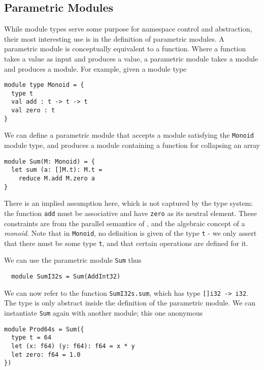 \documentclass[oneside,11pt]{book}
\begin{document}
\subsection{Parametric Modules}

While module types serve some purpose for namespace control and
abstraction, their most interesting use is in the definition of
parametric modules.  A parametric module is conceptually
equivalent to a function.  Where a function takes a value as input and
produces a value, a parametric module takes a module and produces a
module.  For example, given a module type

\begin{lstlisting}
module type Monoid = {
  type t
  val add : t -> t -> t
  val zero : t
}
\end{lstlisting}

We can define a parametric module that accepts a module satisfying
the \texttt{Monoid} module type, and produces a module containing a
function for collapsing an array

\begin{lstlisting}
module Sum(M: Monoid) = {
  let sum (a: []M.t): M.t =
    reduce M.add M.zero a
}
\end{lstlisting}

There is an implied assumption here, which is not captured by the type
system: the function \texttt{add} must be associative and have
\texttt{zero} as its neutral element.  These constraints are from the
parallel semantics of , and the algebraic concept of a
\textit{monoid}.  Note that in \texttt{Monoid}, no definition is given
of the type \texttt{t} - we only assert that there must be some type
\texttt{t}, and that certain operations are defined for it.

We can use the parametric module \texttt{Sum} thus

\begin{lstlisting}
  module SumI32s = Sum(AddInt32)
\end{lstlisting}

We can now refer to the function \texttt{SumI32s.sum}, which has type
\texttt{[]i32 -> i32}.  The type is only abstract inside the definition of
the parametric module.  We can instantiate \texttt{Sum} again with
another module; this one anonymous

\begin{lstlisting}
module Prod64s = Sum({
  type t = 64
  let (x: f64) (y: f64): f64 = x * y
  let zero: f64 = 1.0
})
\end{lstlisting}
\end{document}
